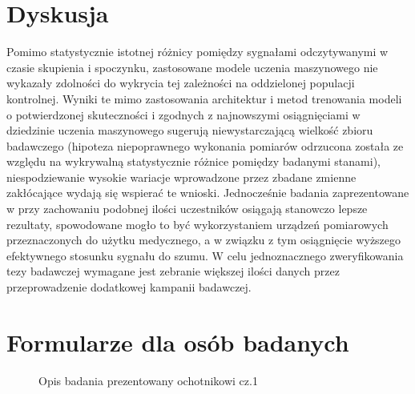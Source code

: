 \documentclass{./assets/wfis}
\begin{document}



\chapter{Dyskusja}\label{dyskusja}
Pomimo statystycznie istotnej różnicy pomiędzy sygnałami odczytywanymi w czasie skupienia i spoczynku, zastosowane modele uczenia maszynowego nie wykazały zdolności do wykrycia tej zależności na oddzielonej populacji kontrolnej. Wyniki te mimo zastosowania architektur \cite{} i metod trenowania modeli \cite{} o potwierdzonej skuteczności i zgodnych z najnowszymi osiągnięciami w dziedzinie uczenia maszynowego sugerują niewystarczającą wielkość zbioru badawczego (hipoteza niepoprawnego wykonania pomiarów odrzucona została ze względu na wykrywalną statystycznie różnice pomiędzy badanymi stanami), niespodziewanie wysokie wariacje wprowadzone przez zbadane zmienne zakłócające wydają się wspierać te wnioski. Jednocześnie badania zaprezentowane w \cite{} przy zachowaniu podobnej ilości uczestników osiągają stanowczo lepsze rezultaty, spowodowane mogło to być wykorzystaniem urządzeń pomiarowych przeznaczonych do użytku medycznego, a w związku z tym osiągnięcie wyższego efektywnego stosunku sygnału do szumu. W celu jednoznacznego zweryfikowania tezy badawczej wymagane jest zebranie większej ilości danych przez przeprowadzenie dodatkowej kampanii badawczej.

\printbibliography

\clearpage
\listoffigures
\clearpage
\listoftables
\clearpage
\lstlistoflisting
\clearpage

\appendix
\chapter{Formularze dla osób badanych}\label{formularz-dla-osoby-badanej}

\begin{figure}[h!]
    \centering
    \caption{Opis badania prezentowany ochotnikowi cz.1}
    \label{opis-badania}
\end{figure}
\end{document}
